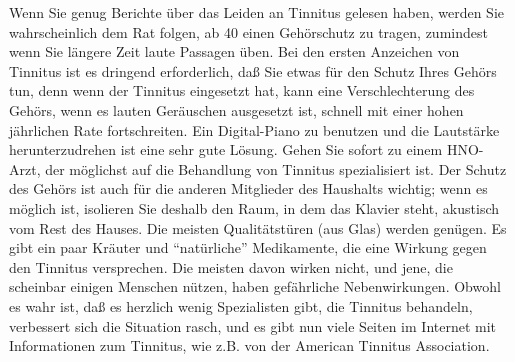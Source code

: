 Wenn Sie genug Berichte über das Leiden an Tinnitus gelesen haben, werden Sie wahrscheinlich dem Rat folgen, ab 40 einen Gehörschutz zu tragen, zumindest wenn Sie längere Zeit laute Passagen üben.
Bei den ersten Anzeichen von Tinnitus ist es dringend erforderlich, daß Sie etwas für den Schutz Ihres Gehörs tun, denn wenn der Tinnitus eingesetzt hat, kann eine Verschlechterung des Gehörs, wenn es lauten Geräuschen ausgesetzt ist, schnell mit einer hohen jährlichen Rate fortschreiten.
Ein Digital-Piano zu benutzen und die Lautstärke herunterzudrehen ist eine sehr gute Lösung.
Gehen Sie sofort zu einem HNO-Arzt, der möglichst auf die Behandlung von Tinnitus spezialisiert ist.
Der Schutz des Gehörs ist auch für die anderen Mitglieder des Haushalts wichtig; wenn es möglich ist, isolieren Sie deshalb den Raum, in dem das Klavier steht, akustisch vom Rest des Hauses.
Die meisten Qualitätstüren (aus Glas) werden genügen.
Es gibt ein paar Kräuter und \enquote{natürliche} Medikamente, die eine Wirkung gegen den Tinnitus versprechen.
Die meisten davon wirken nicht, und jene, die scheinbar einigen Menschen nützen, haben gefährliche Nebenwirkungen.
Obwohl es wahr ist, daß es herzlich wenig Spezialisten gibt, die Tinnitus behandeln, verbessert sich die Situation rasch, und es gibt nun viele Seiten im Internet mit Informationen zum Tinnitus, wie z.B. von der American Tinnitus Association.



